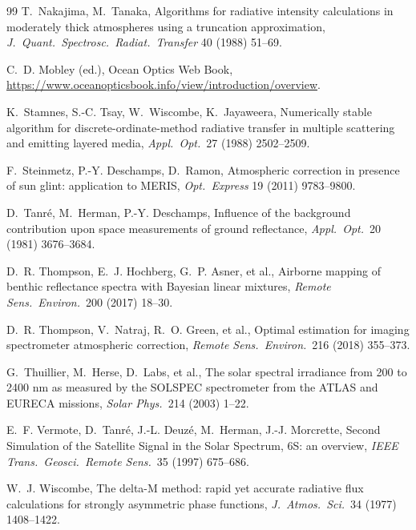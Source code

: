 \documentclass[11pt]{article}
\numberwithin{equation}{section}
\begin{document}
\begin{thebibliography}{99}
 T.~Nakajima, M.~Tanaka, Algorithms for radiative intensity
calculations in moderately thick atmospheres using a truncation approximation, \textit{J.\
Quant.\ Spectrosc.\ Radiat.\ Transfer} 40 (1988) 51--69.

 C.~D. Mobley (ed.), Ocean Optics Web Book,
\url{https://www.oceanopticsbook.info/view/introduction/overview}.

 K.~Stamnes, S.-C. Tsay, W.~Wiscombe, K.~Jayaweera, Numerically stable
algorithm for discrete-ordinate-method radiative transfer in multiple scattering and emitting
layered media, \textit{Appl.\ Opt.}\ 27 (1988) 2502--2509.

 F.~Steinmetz, P.-Y. Deschamps, D.~Ramon, Atmospheric correction in
presence of sun glint: application to MERIS, \textit{Opt.\ Express} 19 (2011) 9783--9800.

 D.~Tanr\'e, M.~Herman, P.-Y. Deschamps, Influence of the background
contribution upon space measurements of ground reflectance, \textit{Appl.\ Opt.}\ 20 (1981)
3676--3684.

 D.~R. Thompson, E.~J. Hochberg, G.~P. Asner, et al., Airborne mapping
of benthic reflectance spectra with Bayesian linear mixtures, \textit{Remote Sens.\ Environ.}\
200 (2017) 18--30.

 D.~R. Thompson, V.~Natraj, R.~O. Green, et al., Optimal estimation for
imaging spectrometer atmospheric correction, \textit{Remote Sens.\ Environ.}\ 216 (2018)
355--373.

 G.~Thuillier, M.~Herse, D.~Labs, et al., The solar spectral
irradiance from 200 to 2400 nm as measured by the SOLSPEC spectrometer from the ATLAS and
EURECA missions, \textit{Solar Phys.}\ 214 (2003) 1--22.

 E.~F. Vermote, D.~Tanr\'e, J.-L. Deuz\'e, M.~Herman, J.-J. Morcrette,
Second Simulation of the Satellite Signal in the Solar Spectrum, 6S: an overview, \textit{IEEE
Trans.\ Geosci.\ Remote Sens.}\ 35 (1997) 675--686.

 W.~J. Wiscombe, The delta-M method: rapid yet accurate radiative flux
calculations for strongly asymmetric phase functions, \textit{J.\ Atmos.\ Sci.}\ 34 (1977)
1408--1422.

\end{thebibliography}
\end{document}
